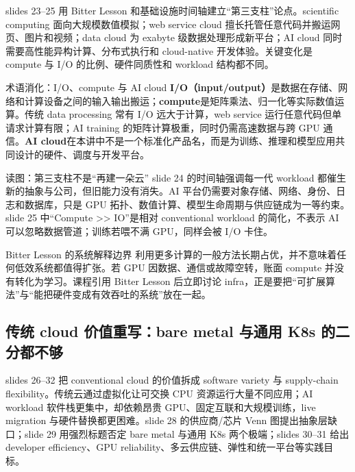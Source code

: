 slides 23--25 用 Bitter Lesson 和基础设施时间轴建立“第三支柱”论点。scientific computing 面向大规模数值模拟；web service cloud 擅长托管任意代码并搬运网页、图片和视频；data cloud 为 exabyte 级数据处理形成新平台；AI cloud 同时需要高性能异构计算、分布式执行和 cloud-native 开发体验。关键变化是 compute 与 I/O 的比例、硬件同质性和 workload 结构都不同。


\begin{knowledgebox}{术语消化：I/O、compute 与 AI cloud}
\textbf{I/O（input/output）}是数据在存储、网络和计算设备之间的输入输出搬运；\textbf{compute}是矩阵乘法、归一化等实际数值运算。传统 data processing 常有 I/O 远大于计算，web service 运行任意代码但单请求计算有限；AI training 的矩阵计算极重，同时仍需高速数据与跨 GPU 通信。\textbf{AI cloud}在本讲中不是一个标准化产品名，而是为训练、推理和模型应用共同设计的硬件、调度与开发平台。
\end{knowledgebox}

\begin{knowledgebox}{读图：第三支柱不是“再建一朵云”}
slide 24 的时间轴强调每一代 workload 都催生新的抽象与公司，但旧能力没有消失。AI 平台仍需要对象存储、网络、身份、日志和数据库，只是 GPU 拓扑、数值计算、模型生命周期与供应链成为一等约束。slide 25 中“Compute >> IO”是相对 conventional workload 的简化，不表示 AI 可以忽略数据管道；训练若喂不满 GPU，同样会被 I/O 卡住。
\end{knowledgebox}

\begin{warningbox}{Bitter Lesson 的系统解释边界}
利用更多计算的一般方法长期占优，并不意味着任何低效系统都值得扩张。若 GPU 因数据、通信或故障空转，账面 compute 并没有转化为学习。课程引用 Bitter Lesson 后立即讨论 infra，正是要把“可扩展算法”与“能把硬件变成有效吞吐的系统”放在一起。
\end{warningbox}

\subsection{传统 cloud 价值重写：bare metal 与通用 K8s 的二分都不够}

slides 26--32 把 conventional cloud 的价值拆成 software variety 与 supply-chain flexibility。传统云通过虚拟化让可交换 CPU 资源运行大量不同应用；AI workload 软件栈更集中，却依赖昂贵 GPU、固定互联和大规模训练，live migration 与硬件替换都更困难。slide 28 的供应商/芯片 Venn 图提出抽象层缺口；slide 29 用强烈标题否定 bare metal 与通用 K8s 两个极端；slides 30--31 给出 developer efficiency、GPU reliability、多云供应链、弹性和统一平台等实践目标。

